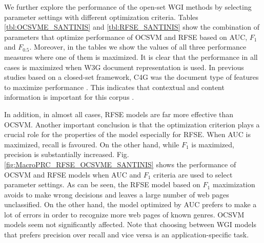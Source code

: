\documentclass[runningheads]{llncs}
\begin{document}
\hfill \break


%

We further explore the performance of the open-set WGI methods by selecting parameter settings with different optimization criteria. Tables \ref{tbl:OCSVME_SANTINIS} and \ref{tbl:RFSE_SANTINIS} show the combination of parameters that optimize performance of OCSVM and RFSE based on AUC, $F_{1}$ and $F_{0.5}$. Moreover, in the tables we show the values of all three performance measures where one of them is maximized. It is clear that the performance in all cases is maximized when W3G document representation is used. In previous studies based on a closed-set framework, C4G was the document type of features to maximize performance \citep{Sharroff2010}. This indicates that contextual and content information is important for this corpus \citep{Asheghi2015}.

In addition, in almost all cases, RFSE models are far more effective than OCSVM. Another important conclusion is that the optimization criterion plays a crucial role for the properties of the model especially for RFSE. When AUC is maximized, recall is favoured. On the other hand, while $F_{1}$ is maximized, precision is substantially increased. Fig.  \ref{fig:MacroPRC_RFSE_OCSVME_SANTINIS} shows the performance of OCSVM and RFSE models when AUC and $F_{1}$ criteria are used to select parameter settings. As can be seen, the RFSE model based on $F_{1}$ maximization avoids to make wrong decisions and leaves a large number of web pages unclassified. On the other hand, the model optimized by AUC prefers to make a lot of errors in order to recognize more web pages of known genres. OCSVM models seem not significantly affected. Note that choosing between WGI models that prefers precision over recall and vice versa is an application-specific task.
\end{document}
